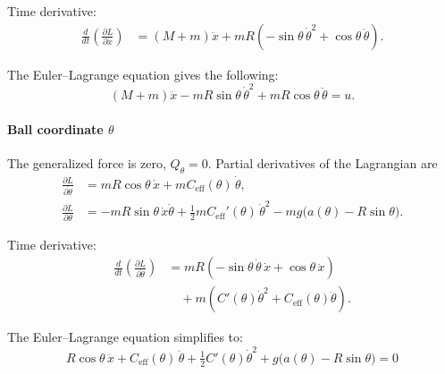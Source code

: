 Time derivative:
\begin{equation}
\begin{split}
\frac{d}{dt} \left( \frac{\partial L}{\partial \dot{x}} \right) 
&= (M+m)\ddot{x} + m R \left(-\sin\theta \, \dot\theta^2 + \cos\theta \, \ddot\theta \right).
\end{split}
\end{equation}


The Euler--Lagrange equation gives the following:
\begin{equation}
\label{eq:x_final_eq}
\boxed{(M+m)\ddot{x} - m R \sin\theta \, \dot\theta^2 + m R \cos\theta \, \ddot\theta = u.}
\end{equation}

\paragraph{Ball coordinate $\theta$}  
The generalized force is zero, $Q_\theta = 0$. Partial derivatives of the Lagrangian are
\begin{equation}
\begin{split}
\frac{\partial L}{\partial \dot{\theta}} &= m R \cos\theta \, \dot{x} + m C_\mathrm{eff}(\theta) \, \dot\theta, \\
\frac{\partial L}{\partial \theta} &= - m R \sin\theta \, \dot{x} \dot{\theta}
  + \tfrac{1}{2} m C_\mathrm{eff}'(\theta) \, \dot\theta^2
  - m g \bigl(a(\theta) - R\sin\theta\bigr).
\end{split}
\end{equation}

Time derivative:
\begin{equation}
\begin{split}
\frac{d}{dt} \left( \frac{\partial L}{\partial \dot{\theta}} \right) 
&= m R (-\sin\theta \, \dot\theta \, \dot{x} + \cos\theta \, \ddot{x}) \\[2pt]
&\quad + m \left( C'(\theta) \dot\theta^2 + C_\mathrm{eff}(\theta) \ddot{\theta} \right).
\end{split}
\end{equation}

The Euler--Lagrange equation simplifies to:
\begin{equation}
\label{eq:theta_final_eq}
\boxed{
R \cos\theta\,\ddot{x}
+ C_\mathrm{eff}(\theta)\,\ddot{\theta}
+ \tfrac{1}{2}C'(\theta)\dot{\theta}^2
+ g\bigl(a(\theta) - R\sin\theta\bigr) = 0
}
\end{equation}

